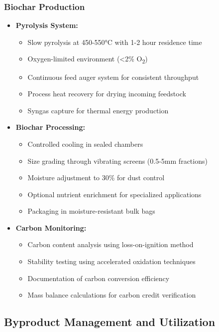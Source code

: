 \subsubsection{Biochar Production} \label{sec:biochar_inputs}
\begin{itemize}
    \item \textbf{Pyrolysis System:}
    \begin{itemize}
        \item Slow pyrolysis at 450-550°C with 1-2 hour residence time
        \item Oxygen-limited environment (<2\% O\textsubscript{2})
        \item Continuous feed auger system for consistent throughput
        \item Process heat recovery for drying incoming feedstock
        \item Syngas capture for thermal energy production
    \end{itemize}
    
    \item \textbf{Biochar Processing:}
    \begin{itemize}
        \item Controlled cooling in sealed chambers
        \item Size grading through vibrating screens (0.5-5mm fractions)
        \item Moisture adjustment to 30\% for dust control
        \item Optional nutrient enrichment for specialized applications
        \item Packaging in moisture-resistant bulk bags
    \end{itemize}
    
    \item \textbf{Carbon Monitoring:}
    \begin{itemize}
        \item Carbon content analysis using loss-on-ignition method
        \item Stability testing using accelerated oxidation techniques
        \item Documentation of carbon conversion efficiency
        \item Mass balance calculations for carbon credit verification
    \end{itemize}
\end{itemize}

\subsection{Byproduct Management and Utilization}
\label{sec:byproduct_management}

